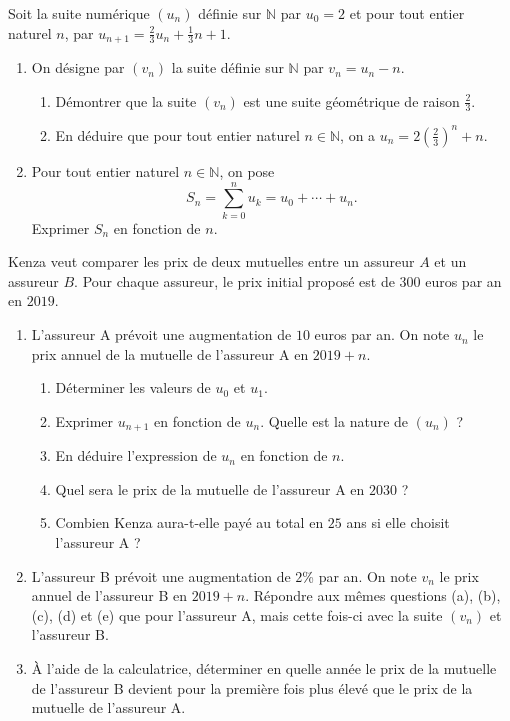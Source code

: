 \documentclass[11pt]{article}
\begin{document}
\begin{exo}
  Soit la suite numérique $\left( u_n \right)$ définie sur $\mathbb{N}$ par
  $u_0=2$ et pour tout entier naturel $n$, par $u_{n+1} =
  \frac{2}{3}u_n+\frac{1}{3}n+1$.
  \begin{enumerate}
    \item On désigne par $\left( v_n \right)$ la suite définie sur $\mathbb{N}$
      par $v_n = u_n - n$.
      \begin{enumerate}
        \item Démontrer que la suite $\left( v_n \right)$ est une suite
          géométrique de raison $\frac{2}{3}$.
        \item En déduire que pour tout entier naturel $n\in\mathbb{N}$, on a
          $u_n = 2\left( \frac{2}{3} \right)^n+n$.
      \end{enumerate}
    \item Pour tout entier naturel $n\in\mathbb{N}$, on pose
      \[
        S_n=\sum_{k=0}^n u_k=u_0+\cdots+u_n.
      \]
      Exprimer $S_n$ en fonction de $n$.
  \end{enumerate}
\end{exo}

\begin{exo}
  Kenza veut comparer les prix de deux mutuelles entre un assureur $A$ et un
  assureur $B$. Pour chaque assureur, le prix initial proposé est de $300$
  euros par an en $2019$.
  \begin{enumerate}
    \item L'assureur A prévoit une augmentation de $10$ euros par an. On note
      $u_n$ le prix annuel de la mutuelle de l'assureur A en $2019+n$.
      \begin{enumerate}
        \item Déterminer les valeurs de $u_0$ et $u_1$.
        \item Exprimer $u_{n+1}$ en fonction de $u_n$. Quelle est la nature de
          $\left( u_n \right)$ ?
        \item En déduire l'expression de $u_n$ en fonction de $n$.
        \item Quel sera le prix de la mutuelle de l'assureur A en $2030$ ?
        \item Combien Kenza aura-t-elle payé au total en $25$ ans si elle
          choisit l'assureur A ?
      \end{enumerate}
    \item L'assureur B prévoit une augmentation de $2$\% par an. On note $v_n$
      le prix annuel de l'assureur B en $2019+n$. Répondre aux mêmes questions
      (a), (b), (c), (d) et (e) que pour l'assureur A, mais cette fois-ci avec
      la suite $\left( v_n \right)$ et l'assureur B.
    \item À l'aide de la calculatrice, déterminer en quelle année le prix de la
      mutuelle de l'assureur B devient pour la première fois plus élevé que le
      prix de la mutuelle de l'assureur A.
  \end{enumerate}
\end{exo}
\end{document}
